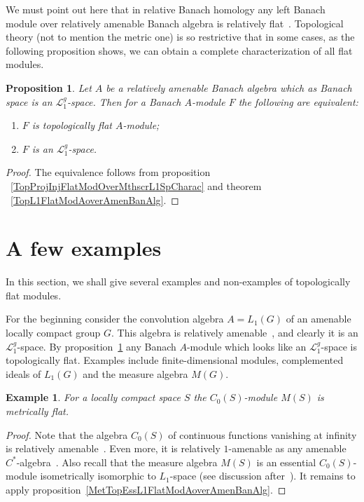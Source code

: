 \documentclass[12pt]{article}
\newtheorem{proposition}[theorem]{Proposition}
\newtheorem{example}[theorem]{Example}
\begin{document}
We must point out here that in relative Banach homology any left Banach module
over relatively amenable Banach algebra is relatively flat~\cite[theorem
7.1.60]{HelBanLocConvAlg}. Topological theory (not to mention the metric one) is
so restrictive that in some cases, as the following proposition shows, we can
obtain a complete characterization of all flat modules.

\begin{proposition}\label{TopFlatModAoverAmenL1BanAlgCharac} Let $A$ be a
relatively amenable Banach algebra which as Banach space is an
$\mathcal{L}_1^g$-space. Then for a Banach $A$-module $F$ the following are
equivalent:
\begin{enumerate}[label = (\roman*)]
\item $F$ is topologically flat $A$-module;
\item $F$ is an $\mathcal{L}_1^g$-space.
\end{enumerate}
\end{proposition}
\begin{proof} The equivalence follows from proposition
~\ref{TopProjInjFlatModOverMthscrL1SpCharac} and theorem
~\ref{TopL1FlatModAoverAmenBanAlg}.
\end{proof}


\section{A few examples}\label{SectionAFewExamples}

In this section, we shall give several examples and non-examples of
topologically flat modules.

For the beginning consider the convolution algebra $A=L_1(G)$ of an amenable
locally compact group $G$. This algebra is relatively amenable~\cite[proposition
VII.1.86]{HelBanLocConvAlg}, and clearly it is an $\mathcal{L}_1^g$-space. By
proposition~\ref{TopFlatModAoverAmenL1BanAlgCharac} any Banach $A$-module which
looks like an $\mathcal{L}_1^g$-space is topologically flat. Examples include
finite-dimensional modules, complemented ideals of $L_1(G)$ and the measure
algebra $M(G)$.

\begin{example} For a locally compact space $S$ the $C_0(S)$-module $M(S)$ is
metrically flat.
\end{example}
\begin{proof}
Note that the algebra $C_0(S)$ of continuous functions vanishing at infinity is
relatively amenable~\cite[theorem 7.1.87]{HelBanLocConvAlg}. Even more, it is
relatively $1$-amenable as any amenable $C^*$-algebra~\cite[example
2]{RundeAmenConstFour}. Also recall that the measure algebra $M(S)$ is an
essential $C_0(S)$-module isometrically isomorphic to $L_1$-space (see
discussion after~\cite[proposition 2.14]{DalLauSecondDualOfMeasAlg}). It remains
to apply proposition~\ref{MetTopEssL1FlatModAoverAmenBanAlg}.
\end{proof}
\end{document}
